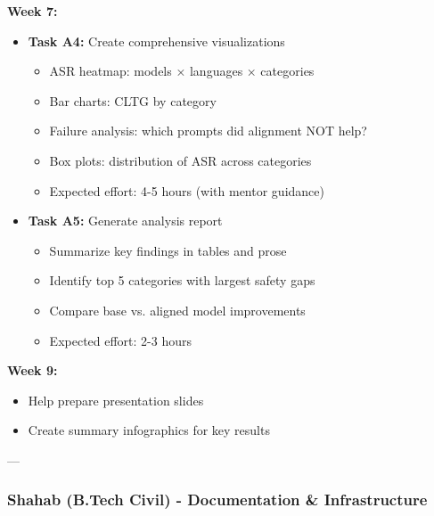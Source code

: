 \documentclass[11pt,a4paper]{article}
\begin{document}
\textbf{Week 7:}
\begin{itemize}
    \item \textbf{Task A4:} Create comprehensive visualizations
    \begin{itemize}
        \item ASR heatmap: models × languages × categories
        \item Bar charts: CLTG by category
        \item Failure analysis: which prompts did alignment NOT help?
        \item Box plots: distribution of ASR across categories
        \item Expected effort: 4-5 hours (with mentor guidance)
    \end{itemize}

    \item \textbf{Task A5:} Generate analysis report
    \begin{itemize}
        \item Summarize key findings in tables and prose
        \item Identify top 5 categories with largest safety gaps
        \item Compare base vs. aligned model improvements
        \item Expected effort: 2-3 hours
    \end{itemize}
\end{itemize}

\textbf{Week 9:}
\begin{itemize}
    \item Help prepare presentation slides
    \item Create summary infographics for key results
\end{itemize}

---

\subsubsection{Shahab (B.Tech Civil) - Documentation \& Infrastructure}
\end{document}
